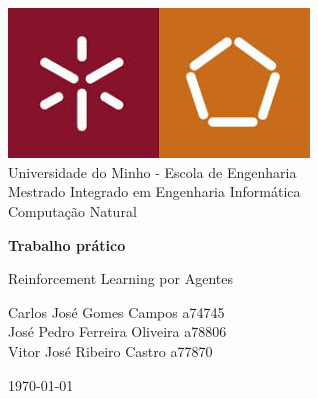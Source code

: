 \documentclass[runningheads]{article}
\begin{document}
\begin{titlepage}
\begin{center}

\includegraphics[width=0.6\textwidth]{images/EElogo.jpg}\\[0.5cm]

{\large Universidade do Minho - Escola de Engenharia}\\[0.5cm]

{\large Mestrado Integrado em Engenharia Informática}\\[0.5cm]

{\large Computação Natural}\\[0.5cm]

\vspace{2.5cm}

{ \huge \bfseries Trabalho prático \par 
Reinforcement Learning por Agentes\\[0.4cm]}

\vspace{2cm}

Carlos José Gomes Campos a74745 \\
José Pedro Ferreira Oliveira a78806 \\
Vitor José Ribeiro Castro a77870 \\

\vspace{3cm}

{\large \today}

\end{center}
\end{titlepage}

\begin{abstract}
Este relatório descreve os passos necessários ao desenvolvimento do projeto proposto pela equipa docente, a saber, a aprendizagem por reinforcement learning de um agente. O processo compreende o desenvolvimento de um modelo de reinforcement learning, - no caso, Q-Learning, - bem como a otimização dos parâmetros de treino, - no caso, através de Particle Swarm Optimization. Para tal, o ambiente de desenvolvimento requerido é Python.
Este projeto foi desenvolvido no âmbito da unidade curricular de Computação Natural, do perfil de Sistemas Inteligentes, do Mestrado Integrado em Engenharia Informática, na Universidade do Minho.

\end{abstract}
\end{document}
